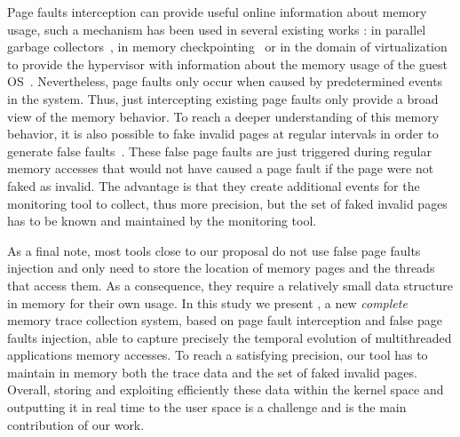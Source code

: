 Page faults interception can provide useful online information about memory usage,
such a mechanism has been used in several existing works : in parallel
garbage collectors~\cite{Boehm91Mostly}, in memory
checkpointing~\cite{Heo05Spaceefficient} or in the domain of virtualization to
provide the hypervisor with information about the memory usage of the guest
OS~\cite{Jones06Geiger}. Nevertheless, page faults only occur when caused by predetermined
events in the system. Thus, just intercepting existing page faults only provide a broad view of the
memory behavior. To reach a deeper understanding of this memory behavior,
it is also possible to fake invalid pages at regular intervals in order to generate false faults~\cite{Bae12Dynamic,Diener13CommunicationBased}.
These false page faults are just triggered during regular memory accesses that would not have 
caused a page fault if the page were not faked as invalid. The advantage is that they create additional
events for the monitoring tool to collect, thus more precision, but the set of faked invalid pages has to be known and maintained by the monitoring tool.

As a final note, most tools close to our proposal do not use false page faults injection and only need to store the location of memory pages and the threads that access them.
As a consequence, they require a relatively small data structure in memory for their own usage.
In this study we present \Moca, a new \emph{complete} memory trace collection system, based on page
fault interception and false page faults injection, able to capture precisely the temporal evolution of multithreaded applications memory accesses.
To reach a satisfying precision, our tool has to maintain in memory both the trace data and
the set of faked invalid pages. Overall, storing and exploiting efficiently these data within the kernel space and outputting it in real time to the user space
is a challenge and is the main contribution of our work.
